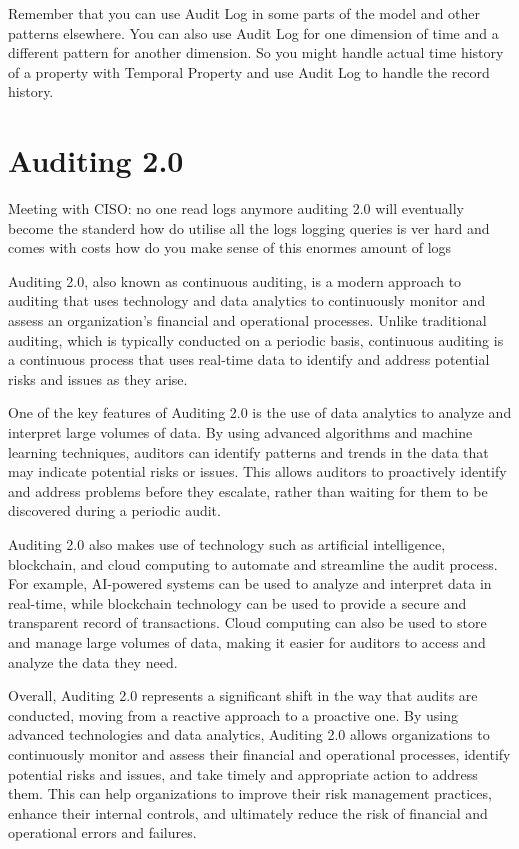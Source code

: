 Remember that you can use Audit Log in some parts of the model and other patterns elsewhere. You can also use Audit Log for one dimension of time and a different pattern for another dimension. So you might handle actual time history of a property with Temporal Property and use Audit Log to handle the record history.

\section{Auditing 2.0}

Meeting with CISO:
no one read logs anymore
auditing 2.0 will eventually become the standerd
how do utilise all the logs
logging queries is ver hard and comes with costs
how do you make sense of this enormes amount of logs

Auditing 2.0, also known as continuous auditing, is a modern approach to auditing that uses technology and data analytics to continuously monitor and assess an organization's financial and operational processes. Unlike traditional auditing, which is typically conducted on a periodic basis, continuous auditing is a continuous process that uses real-time data to identify and address potential risks and issues as they arise.

One of the key features of Auditing 2.0 is the use of data analytics to analyze and interpret large volumes of data. By using advanced algorithms and machine learning techniques, auditors can identify patterns and trends in the data that may indicate potential risks or issues. This allows auditors to proactively identify and address problems before they escalate, rather than waiting for them to be discovered during a periodic audit.

Auditing 2.0 also makes use of technology such as artificial intelligence, blockchain, and cloud computing to automate and streamline the audit process. For example, AI-powered systems can be used to analyze and interpret data in real-time, while blockchain technology can be used to provide a secure and transparent record of transactions. Cloud computing can also be used to store and manage large volumes of data, making it easier for auditors to access and analyze the data they need.

Overall, Auditing 2.0 represents a significant shift in the way that audits are conducted, moving from a reactive approach to a proactive one. By using advanced technologies and data analytics, Auditing 2.0 allows organizations to continuously monitor and assess their financial and operational processes, identify potential risks and issues, and take timely and appropriate action to address them. This can help organizations to improve their risk management practices, enhance their internal controls, and ultimately reduce the risk of financial and operational errors and failures.

